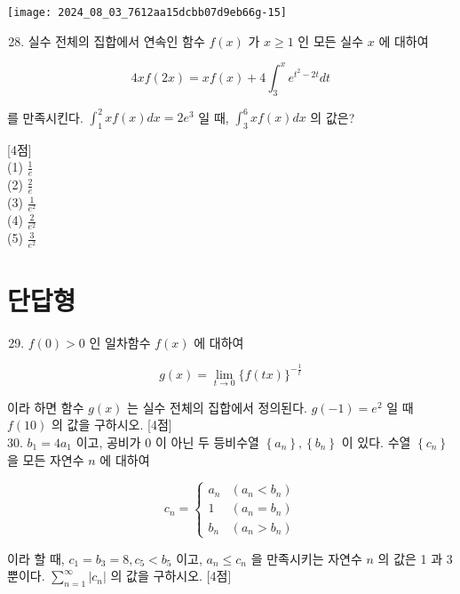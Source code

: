 \documentclass[10pt]{article}
\begin{document}
\begin{center}
\texttt{[image: 2024\_08\_03\_7612aa15dcbb07d9eb66g-15]}
\end{center}

\begin{enumerate}
  \setcounter{enumi}{27}
  \item 실수 전체의 집합에서 연속인 함수 \(f(x)\) 가 \(x \geq 1\) 인 모든 실수 \(x\) 에 대하여
\end{enumerate}

\[
4 x f(2 x)=x f(x)+4 \int_{3}^{x} e^{t^{2}-2 t} d t
\]

를 만족시킨다. \(\int_{1}^{2} x f(x) d x=2 e^{3}\) 일 때, \(\int_{3}^{6} x f(x) d x\) 의 값은?

[4점]\\
(1) \(\frac{1}{e}\)\\
(2) \(\frac{2}{e}\)\\
(3) \(\frac{1}{e^{2}}\)\\
(4) \(\frac{2}{e^{2}}\)\\
(5) \(\frac{3}{e^{2}}\)

\section*{단답형}
\begin{enumerate}
  \setcounter{enumi}{28}
  \item \(f(0)>0\) 인 일차함수 \(f(x)\) 에 대하여
\end{enumerate}

\[
g(x)=\lim _{t \rightarrow 0}\{f(t x)\}^{-\frac{1}{t}}
\]

이라 하면 함수 \(g(x)\) 는 실수 전체의 집합에서 정의된다. \(g(-1)=e^{2}\) 일 때 \(f(10)\) 의 값을 구하시오. [4점]\\
30. \(b_{1}=4 a_{1}\) 이고, 공비가 0 이 아닌 두 등비수열 \(\left\{a_{n}\right\},\left\{b_{n}\right\}\) 이 있다. 수열 \(\left\{c_{n}\right\}\) 을 모든 자연수 \(n\) 에 대하여

\[
c_{n}= \begin{cases}a_{n} & \left(a_{n}<b_{n}\right) \\ 1 & \left(a_{n}=b_{n}\right) \\ b_{n} & \left(a_{n}>b_{n}\right)\end{cases}
\]

이라 할 때, \(c_{1}=b_{3}=8, c_{5}<b_{5}\) 이고, \(a_{n} \leq c_{n}\) 을 만족시키는 자연수 \(n\) 의 값은 1 과 3 뿐이다. \(\sum_{n=1}^{\infty}\left|c_{n}\right|\) 의 값을 구하시오. [4점]
\end{document}
